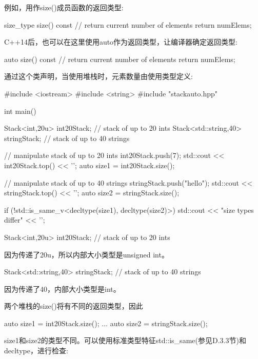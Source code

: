 例如，用作size()成员函数的返回类型:

\begin{cpp}
size_type size() const { // return current number of elements
	return numElems;
}
\end{cpp}

C++14后，也可以在这里使用auto作为返回类型，让编译器确定返回类型:

\begin{cpp}
auto size() const { // return current number of elements
	return numElems;
}
\end{cpp}

通过这个类声明，当使用堆栈时，元素数量由使用类型定义:

\begin{cpp}
#include <iostream>
#include <string>
#include "stackauto.hpp"

int main()
{
	Stack<int,20u> int20Stack; // stack of up to 20 ints
	Stack<std::string,40> stringStack; // stack of up to 40 strings
	
	// manipulate stack of up to 20 ints
	int20Stack.push(7);
	std::cout << int20Stack.top() << '\n';
	auto size1 = int20Stack.size();
	
	// manipulate stack of up to 40 strings
	stringStack.push("hello");
	std::cout << stringStack.top() << '\n';
	auto size2 = stringStack.size();
	
	if (!std::is_same_v<decltype(size1), decltype(size2)>) {
		std::cout << "size types differ" << '\n';
	}
}
\end{cpp}


\begin{cpp}
Stack<int,20u> int20Stack; // stack of up to 20 ints
\end{cpp}

因为传递了20u，所以内部大小类型是unsigned int。

\begin{cpp}
Stack<std::string,40> stringStack; // stack of up to 40 strings
\end{cpp}

因为传递了40，内部大小类型是int。

两个堆栈的size()将有不同的返回类型，因此

\begin{cpp}
auto size1 = int20Stack.size();
...
auto size2 = stringStack.size();
\end{cpp}

size1和size2的类型不同。可以使用标准类型特征std::is\_same(参见D.3.3节)和decltype，进行检查:

